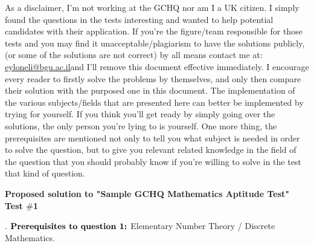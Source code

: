 \documentclass[11pt]{article}
\newcommand{\newnew}{\newline\newline}
\begin{document}
As a disclaimer, I'm not working at the GCHQ nor am I a UK citizen. I simply found the questions in the tests interesting and wanted to help potential candidates with their application. If you're the figure/team responsible for those tests and you may find it unacceptable/plagiarism to have the solutions publicly, (or some of the solutions are not correct) by all means contact me at: \url{eyloneli@bgu.ac.il}\hspace{2mm}and I'll remove this document effective immediately.\newnew
I encourage every reader to firstly solve the problems by themselves, and only then compare their solution with the purposed one in this document. The implementation of the various subjects/fields that are presented here can better be implemented by trying for yourself. If you think you'll get ready by simply going over the solutions, the only person you're lying to is yourself.
\newnew
One more thing, the prerequisites are mentioned not only to tell you what subject is needed in order to solve the question, but to give you relevant related knowledge in the field of the question that you should probably know if you're willing to solve in the test that kind of question.
\newpage


\begin{center}
\Large
\bf Proposed solution to "Sample GCHQ Mathematics Aptitude Test"\\
\vspace{2mm} Test $\#$1
\end{center}


{\color{white}.}\newline
$\text{\bf {Prerequisites to question 1:}}$ Elementary Number Theory / Discrete Mathematics.
\end{document}
